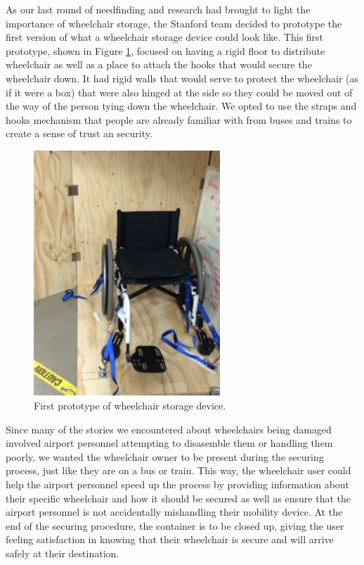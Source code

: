 As our last round of needfinding and research had brought to light the importance of wheelchair storage, the Stanford team decided to prototype the first version of what a wheelchair storage device could look like. This first prototype, shown in 
Figure \ref{fig:wheelchairprototype1.png}, focused on having a rigid floor to distribute wheelchair as well as a place to attach the hooks that would secure the wheelchair down. It had rigid walls that would serve to protect the wheelchair (as if it were a box) that were also hinged at the side so they could be moved out of the way of the person tying down the wheelchair. We opted to use the straps and hooks mechanism that people are already familiar with from buses and trains to create a sense of trust an security. 

\begin{figure}[h]
  \centering
     \includegraphics[width=7cm]{images/wheelchairprototype1.png}
   \caption{First prototype of wheelchair storage device.}
  \label{fig:wheelchairprototype1.png}
\end{figure}

Since many of the stories we encountered about wheelchairs being damaged involved airport personnel attempting to disasemble them or handling them poorly, we wanted the wheelchair owner to be present during the securing process, just like they are on a bus or train. This way, the wheelchair user could help the airport personnel speed up the process by providing information about their specific wheelchair and how it should be secured as well as ensure that the airport personnel is not accidentally mishandling their mobility device. At the end of the securing procedure, the container is to be closed up, giving the user feeling satisfaction in knowing that their wheelchair is secure and will arrive safely at their destination. 
 
